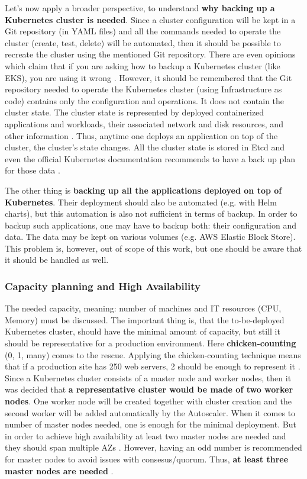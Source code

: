 Let's now apply a broader perspective, to understand \textbf{why backing up a Kubernetes cluster is needed}. Since a cluster configuration will be kept in a Git repository (in YAML files) and all the commands needed to operate the cluster (create, test, delete) will be automated, then it should be possible to recreate the cluster using the mentioned Git repository. There are even opinions which claim that if you are asking how to backup a Kubernetes cluster (like EKS), you are using it wrong \cite{reddit-on-backup}. However, it should be remembered that the Git repository needed to operate the Kubernetes cluster (using Infrastructure as code) contains only the configuration and operations. It does not contain the cluster state. The cluster state is represented by deployed containerized applications and workloads, their associated network and disk resources, and other information \cite{k8s-concepts}. Thus, anytime one deploys an application on top of the cluster, the cluster's state changes. All the cluster state is stored in Etcd and even the official Kubernetes documentation recommends to have a back up plan for those data \cite{k8s-components}.

The other thing is \textbf{backing up all the applications deployed on top of Kubernetes}. Their deployment should also be automated (e.g. with Helm charts), but this automation is also not sufficient in terms of backup. In order to backup such applications, one may have to backup both: their configuration and data. The data may be kept on various volumes (e.g. AWS Elastic Block Store). This problem is, however, out of scope of this work, but one should be aware that it should be handled as well.

\subsubsection{Capacity planning and High Availability}

The needed capacity, meaning: number of machines and IT resources (CPU, Memory) must be discussed. The important thing is, that the to-be-deployed Kubernetes cluster, should have the minimal amount of capacity, but still it should be representative for a production environment. Here \textbf{chicken-counting} (0, 1, many) comes to the rescue. Applying the chicken-counting technique means that if a production site has 250 web servers, 2 should be enough to represent it \cite{book-cicd}. Since a Kubernetes cluster consists of a master node and worker nodes, then it was decided that \textbf{a representative cluster would be made of two worker nodes}. One worker node will be created together with cluster creation and the second worker will be added automatically by the Autoscaler. When it comes to number of master nodes needed, one is enough for the minimal deployment. But in order to achieve high availability at least two master nodes are needed and they should span multiple AZs \cite{article-aws-architecting}. However, having an odd number is recommended for master nodes to avoid issues with consesus/quorum. Thus, \textbf{at least three master nodes are needed} \cite{online-ha-k8s-blog} \cite{online-kops-ha}.

